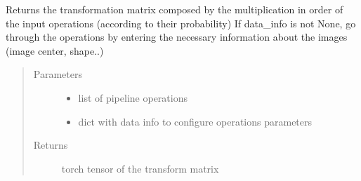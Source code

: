 \documentclass[letterpaper,10pt,english]{sphinxmanual}
\begin{document}
\begin{fulllineitems}
\label{\detokenize{ida_lib.core:ida_lib.core.pipeline_functional.get_compose_matrix}}
Returns the transformation matrix composed by the multiplication in order of
the input operations (according to their probability)
If data\_info is not None, go through the operations by entering the necessary information about the images
(image center, shape..)
\begin{quote}\begin{description}
\item[{Parameters}] \leavevmode\begin{itemize}
\item {} 
 \textendash{} list of pipeline operations

\item {} 
 \textendash{} dict with data info to configure operations parameters

\end{itemize}

\item[{Returns}] \leavevmode
torch tensor of the transform matrix

\end{description}\end{quote}

\end{fulllineitems}

\end{document}
